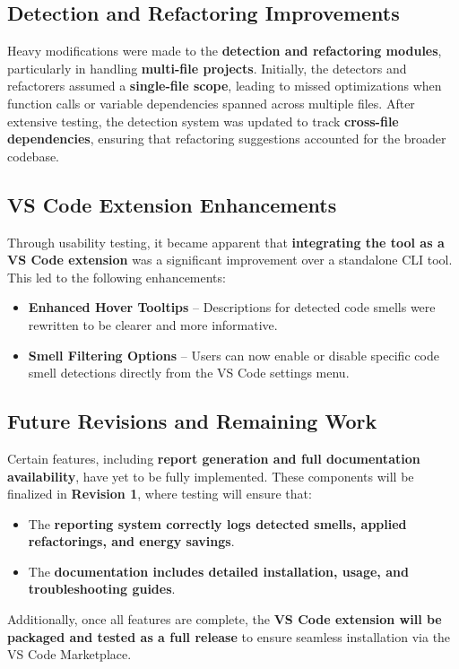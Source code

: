 \documentclass[12pt, titlepage]{article}
\begin{document}
\subsection{Detection and Refactoring Improvements}
Heavy modifications were made to the \textbf{detection and
refactoring modules}, particularly in handling \textbf{multi-file
projects}. Initially, the detectors and refactorers assumed a
\textbf{single-file scope}, leading to missed optimizations when
function calls or variable dependencies spanned across multiple
files. After extensive testing, the detection system was updated to
track \textbf{cross-file dependencies}, ensuring that refactoring
suggestions accounted for the broader codebase.

\subsection{VS Code Extension Enhancements}
Through usability testing, it became apparent that
\textbf{integrating the tool as a VS Code extension} was a
significant improvement over a standalone CLI tool. This led to the
following enhancements:
\begin{itemize}
  \item \textbf{Enhanced Hover Tooltips} – Descriptions for detected
    code smells were rewritten to be clearer and more informative.
  \item \textbf{Smell Filtering Options} – Users can now enable or
    disable specific code smell detections directly from the VS Code
    settings menu.
\end{itemize}

\subsection{Future Revisions and Remaining Work}
Certain features, including \textbf{report generation and full
documentation availability}, have yet to be fully implemented. These
components will be finalized in \textbf{Revision 1}, where testing
will ensure that:
\begin{itemize}
  \item The \textbf{reporting system correctly logs detected smells,
    applied refactorings, and energy savings}.
  \item The \textbf{documentation includes detailed installation,
    usage, and troubleshooting guides}.
\end{itemize}

Additionally, once all features are complete, the \textbf{VS Code
extension will be packaged and tested as a full release} to ensure
seamless installation via the VS Code Marketplace.
\end{document}
